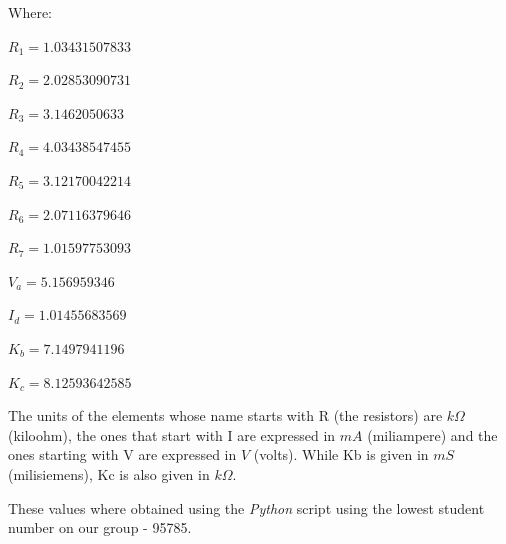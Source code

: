 \begin{center}
Where:

$R_1 = 1.03431507833 $

$R_2 = 2.02853090731$
 
$R_3 = 3.1462050633 $

$R_4 = 4.03438547455$ 

$R_5 = 3.12170042214 $

$R_6 = 2.07116379646 $

$R_7 = 1.01597753093 $

$V_a = 5.156959346 $

$I_d = 1.01455683569 $

$K_b = 7.1497941196 $

$K_c = 8.12593642585 $
\end{center}

The units of the elements whose name starts with R (the resistors) are $k\Omega$ (kiloohm), the ones that start with I are expressed in $mA$ (miliampere) and the ones starting with V are expressed in $V$ (volts). While Kb is given in $mS$ (milisiemens), Kc is also given in $k\Omega$.

These values where obtained using the \textit{Python} script using the lowest student number on our group - 95785.


